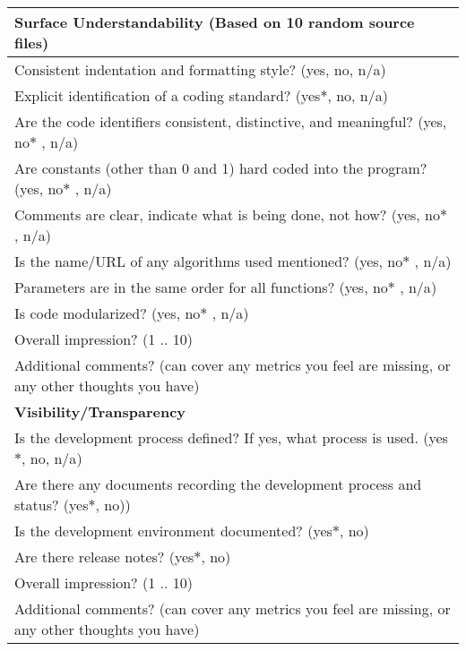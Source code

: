 \begin{table}[H]
\begin{tabular}{p{14cm}}
\hline		
\textbf{Surface Understandability (Based on 10 random source files)}\\
\hline
Consistent indentation and formatting style? ({yes, no, n/a})\\
Explicit identification of a coding standard? ({yes$\ast$, no, n/a})\\
Are the code identifiers consistent, distinctive, and meaningful? ({yes, no$\ast$ , n/a})\\
Are constants (other than 0 and 1) hard coded into the program? ({yes, no$\ast$ , n/a})\\
Comments are clear, indicate what is being done, not how? ({yes, no$\ast$ , n/a})\\
Is the name/URL of any algorithms used mentioned? ({yes, no$\ast$ , n/a})\\
Parameters are in the same order for all functions? ({yes, no$\ast$ , n/a})\\
Is code modularized? ({yes, no$\ast$ , n/a})\\
Overall impression? ({1 .. 10})\\
Additional comments? (can cover any metrics you feel are missing, or any other thoughts you have)\\
\hline		
\textbf{Visibility/Transparency}\\
\hline
Is the development process defined? If yes, what process is used. ({yes$\ast$, no, n/a})\\
Are there any documents recording the development process and status?  ({yes$\ast$, no}))\\
Is the development environment documented? ({yes$\ast$, no})\\
Are there release notes? ({yes$\ast$, no})\\
Overall impression? ({1 .. 10})\\
Additional comments? (can cover any metrics you feel are missing, or any other thoughts you have)\\
\hline
\end{tabular}
\end{table}

